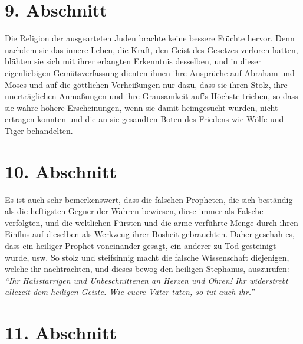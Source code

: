 \section{9. Abschnitt} \label{kap7_ab9}

Die Religion der ausgearteten Juden brachte
keine bessere Früchte hervor. Denn
nachdem sie das innere Leben, die Kraft, den Geist des
Gesetzes verloren hatten,
blähten sie sich mit ihrer erlangten Erkenntnis desselben, und in dieser
eigenliebigen Gemütsverfassung dienten ihnen ihre Ansprüche auf
Abraham und
Moses und auf die göttlichen
Verheißungen nur dazu, dass sie ihren Stolz, ihre
unerträglichen Anmaßungen und ihre
Grausamkeit auf's Höchste trieben, so dass sie
wahre höhere Erscheinungen, wenn sie damit heimgesucht
wurden, nicht ertragen
konnten und die an sie gesandten Boten des Friedens wie Wölfe und Tiger
behandelten.

\section{10. Abschnitt} \label{kap7_ab10}

Es ist auch sehr bemerkenswert, dass die falschen
Propheten, die sich beständig
als die heftigsten Gegner der Wahren bewiesen, diese immer als Falsche
verfolgten, und die weltlichen Fürsten und
die arme verführte Menge durch ihren
Einflus auf dieselben als Werkzeug ihrer Bosheit gebrauchten. Daher geschah es,
dass ein heiliger Prophet voneinander gesagt, ein anderer zu Tod gesteinigt
wurde, usw. So stolz und steifsinnig macht die falsche
Wissenschaft
diejenigen, welche ihr nachtrachten, und dieses bewog den heiligen
 Stephanus,
auszurufen:
\textit{"`Ihr Halsstarrigen und Unbeschnittenen an Herzen und Ohren! Ihr
widerstrebt allezeit dem heiligen Geiste. Wie euere Väter taten, so tut auch
ihr."'}

\section{11. Abschnitt} \label{kap7_ab11}

